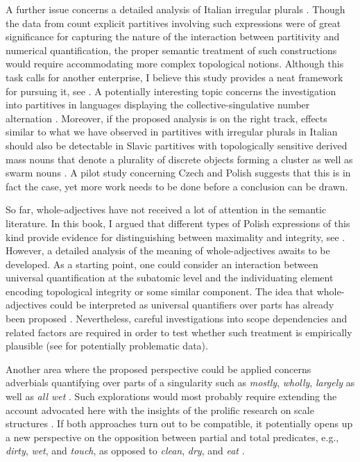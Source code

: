 A further issue concerns a detailed analysis of Italian irregular plurals \citep{ojeda1995semantics,acquaviva2008lexical}. Though the data from count explicit partitives involving such expressions were of great significance for capturing the nature of the interaction between partitivity and numerical quantification, the proper semantic treatment of such constructions would require accommodating more complex topological notions. Although this task calls for another enterprise, I believe this study provides a neat framework for pursuing it, see  . A potentially interesting topic concerns the investigation into partitives in languages displaying the collective-singulative number alternation \citep{grimm2012degrees,grimm2012number}. Moreover, if the proposed analysis is on the right track, effects similar to what we have observed in partitives with irregular plurals in Italian should also be detectable in Slavic partitives with topologically sensitive derived mass nouns that denote a plurality of discrete objects forming a cluster \citep{grimm_docekal-toappear-counting} as well as swarm nouns \citep{henderson2017swarms}. A pilot study concerning Czech and Polish suggests that this is in fact the case, yet more work needs to be done before a conclusion can be drawn.

So far, whole-adjectives have not received a lot of attention in the semantic literature. In this book, I argued that different types of Polish expressions of this kind provide evidence for distinguishing between maximality and integrity, see . However, a detailed analysis of the meaning of whole-adjectives awaits to be developed. As a starting point, one could consider an interaction between universal quantification at the subatomic level and the individuating element encoding topological integrity or some similar component. The idea that whole-adjectives could be interpreted as universal quantifiers over parts has already been proposed \citep{moltmann1997parts}. Nevertheless, careful investigations into scope dependencies and related factors are required in order to test whether such treatment is empirically plausible (see \citealt{morzycki2002wholes} for potentially problematic data).

Another area where the proposed perspective could be applied concerns adverbials quantifying over parts of a singularity such as \textit{mostly}, \textit{wholly}, \textit{largely} \citep[see][]{morzycki2002wholes} as well as \textit{all wet} \citep[see][pp. 162--170]{schwarzschild1996pluralities}. Such explorations would most probably require extending the account advocated here with the insights of the prolific research on scale structures \citep[e.g.,][]{kennedy_mcnally1999event,kennedy_mcnally2005scale}. If both approaches turn out to be compatible, it potentially opens up a new perspective on the opposition between partial and total predicates, e.g., \textit{dirty}, \textit{wet}, and \textit{touch}, as opposed to \textit{clean}, \textit{dry}, and \textit{eat} \citep[e.g.,][]{yoon1996total,rotstein_winter2004total}.

